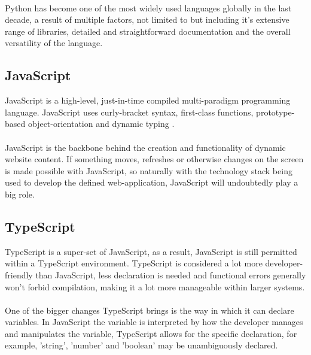 \paragraph{}
Python has become one of the most widely used languages globally in the last decade, a result of multiple factors, not limited to but including it's extensive range of libraries, detailed and straightforward documentation \cite{PYTHON} and the overall versatility of the language.

\paragraph{}

\subsection{JavaScript}
JavaScript is a high-level, just-in-time compiled multi-paradigm programming language. JavaScript uses curly-bracket syntax, first-class functions, prototype-based object-orientation and dynamic typing \cite{JAVASCRIPT}.

\paragraph{}
JavaScript is the backbone behind the creation and functionality of dynamic website content. If something moves, refreshes or otherwise changes on the screen is made possible with JavaScript, so naturally with the technology stack being used to develop the defined web-application, JavaScript will undoubtedly play a big role.

\subsection{TypeScript}
TypeScript is a super-set of JavaScript, as a result, JavaScript is still permitted within a TypeScript environment. TypeScript is considered a lot more developer-friendly than JavaScript, less declaration is needed and functional errors generally won't forbid compilation, making it a lot more manageable within larger systems.

\paragraph{}
One of the bigger changes TypeScript brings is the way in which it can declare variables. In JavaScript the variable is interpreted by how the developer manages and manipulates the variable, TypeScript allows for the specific declaration, for example, 'string', 'number' and 'boolean' may be unambiguously declared.

